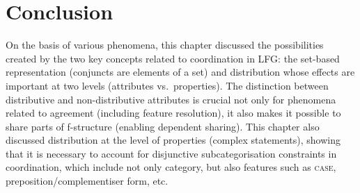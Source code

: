 \documentclass[output=paper]{../langscibook}
\begin{document}


\section{Conclusion}

On the basis of various phenomena, this chapter discussed the
possibilities created by the two key concepts related
to coordination in LFG: the set-based representation (conjuncts
are elements of a set) and distribution whose effects are
important at two levels (attributes vs.\ properties).
%
The distinction
between distributive and non-distributive attributes is crucial not
only for phenomena related to agreement (including feature
resolution), it also makes it possible to share parts of f-structure
(enabling dependent sharing).
%
This chapter also discussed
distribution at the level of properties (complex statements), showing
that it is necessary to account for disjunctive subcategorisation
constraints in coordination, which include not only category, but also
features such as \textsc{case}, preposition/complementiser form,
etc.
\end{document}
